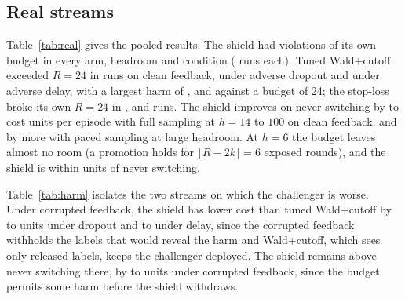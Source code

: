 \documentclass{article}
\theoremstyle{plain}
\theoremstyle{definition}
\begin{document}
\begin{table}[t]
\caption{Exceedance rate of $R=20$ pooled (mean of per-regime rates) over the six stress regimes and the 24 original regimes.}\label{tab:split}
\centering\scriptsize

\end{table}

\begin{table}[t]
\caption{Ablations at $R=12$ (registered C6): worst-regime violation rate with the Wilson 95\% interval.}\label{tab:ablation}
\centering\scriptsize

\end{table}

\subsection{Real streams}
Table~\ref{tab:real} gives the pooled results. The shield had \RealShieldViolClean{} violations of its own budget in every arm, headroom and condition (\RealRunsPerArm{} runs each). Tuned Wald+cutoff exceeded $R=24$ in \RealWaldExceedClean{} runs on clean feedback, \RealWaldExceedDropout{} under adverse dropout and \RealWaldExceedDelay{} under adverse delay, with a largest harm of \RealWaldMaxClean, \RealWaldMaxDropout{} and \RealWaldMaxDelay{} against a budget of 24; the stop-loss broke its own $R=24$ in \RealStopExceedClean, \RealStopExceedDropout{} and \RealStopExceedDelay{} runs. The shield improves on never switching by \RealPiVsNeverCleanHfourteen{} to \RealPiVsNeverCleanHhundred{} cost units per episode with full sampling at $h=14$ to $100$ on clean feedback, and by more with paced sampling at large headroom. At $h=6$ the budget leaves almost no room (a promotion holds for $\lfloor R-2k\rfloor=6$ exposed rounds), and the shield is within \RealSixVsNever{} units of never switching.

Table~\ref{tab:harm} isolates the two streams on which the challenger is worse. Under corrupted feedback, the shield has lower cost than tuned Wald+cutoff by \HarmDropMin{} to \HarmDropMax{} units under dropout and \HarmDelayMin{} to \HarmDelayMax{} under delay, since the corrupted feedback withholds the labels that would reveal the harm and Wald+cutoff, which sees only released labels, keeps the challenger deployed. The shield remains above never switching there, by \HarmNeverMin{} to \HarmNeverMax{} units under corrupted feedback, since the budget permits some harm before the shield withdraws.

\begin{table}[t]
\caption{Two harmful streams (airlines, bank): $\Delta J$ of the full-sampling shield against Wald+cutoff and against never switching, by headroom $h$.}\label{tab:harm}
\centering\scriptsize
\resizebox{\columnwidth}{!}{}
\end{table}
\end{document}
